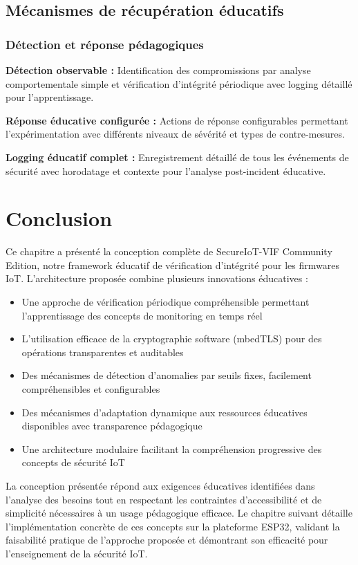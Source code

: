 \subsection{Mécanismes de récupération éducatifs}

\subsubsection{Détection et réponse pédagogiques}

\textbf{Détection observable :} Identification des compromissions par analyse comportementale simple et vérification d'intégrité périodique avec logging détaillé pour l'apprentissage.

\textbf{Réponse éducative configurée :} Actions de réponse configurables permettant l'expérimentation avec différents niveaux de sévérité et types de contre-mesures.

\textbf{Logging éducatif complet :} Enregistrement détaillé de tous les événements de sécurité avec horodatage et contexte pour l'analyse post-incident éducative.

\section{Conclusion}

Ce chapitre a présenté la conception complète de SecureIoT-VIF Community Edition, notre framework éducatif de vérification d'intégrité pour les firmwares IoT. L'architecture proposée combine plusieurs innovations éducatives :

\begin{itemize}
    \item Une approche de vérification périodique compréhensible permettant l'apprentissage des concepts de monitoring en temps réel
    \item L'utilisation efficace de la cryptographie software (mbedTLS) pour des opérations transparentes et auditables
    \item Des mécanismes de détection d'anomalies par seuils fixes, facilement compréhensibles et configurables
    \item Des mécanismes d'adaptation dynamique aux ressources éducatives disponibles avec transparence pédagogique
    \item Une architecture modulaire facilitant la compréhension progressive des concepts de sécurité IoT
\end{itemize}

La conception présentée répond aux exigences éducatives identifiées dans l'analyse des besoins tout en respectant les contraintes d'accessibilité et de simplicité nécessaires à un usage pédagogique efficace. Le chapitre suivant détaille l'implémentation concrète de ces concepts sur la plateforme ESP32, validant la faisabilité pratique de l'approche proposée et démontrant son efficacité pour l'enseignement de la sécurité IoT.